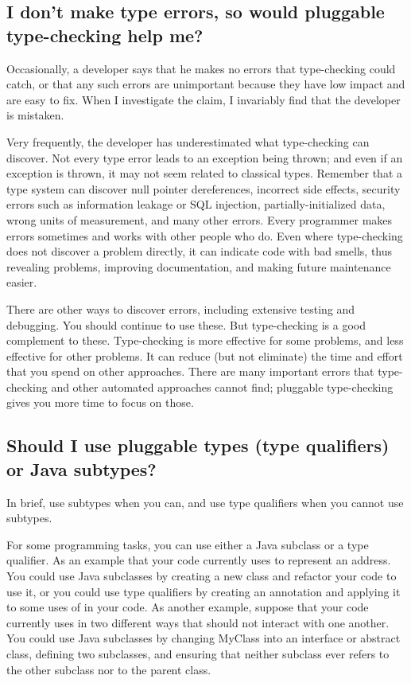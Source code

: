 \subsection{I don't make type errors, so would pluggable type-checking help me?\label{faq-never-make-type-errors}}

Occasionally, a developer says that he makes no errors that type-checking
could catch, or that any such errors are unimportant because they have low
impact and are easy to fix.  When I investigate the claim, I invariably
find that the developer is mistaken.

Very frequently, the developer has underestimated what type-checking can
discover.  Not every type error leads to an exception being thrown; and
even if an exception is thrown, it may not seem related to classical types.
Remember that a type system can discover
null pointer dereferences,
incorrect side effects,
security errors such as information leakage or SQL injection,
partially-initialized data,
wrong units of measurement,
and many other errors.
Every programmer makes errors sometimes and works with other people
who do.
Even where type-checking does not discover a
problem directly, it can indicate code with bad smells, thus revealing
problems, improving documentation, and making future maintenance easier.

There are other ways to discover errors, including extensive testing and
debugging.  You should continue to use these.
But type-checking is a good complement to these.  Type-checking is more
effective for some problems, and less effective for other problems.  It can
reduce (but not eliminate) the time and effort that you spend on other
approaches.  There are many important errors that type-checking and other
automated approaches cannot find; pluggable type-checking gives you more
time to focus on those.


\subsection{Should I use pluggable types (type qualifiers) or Java subtypes?\label{faq-typequals-vs-subtypes}}

\label{when-to-use-type-qualifiers}
\label{faq-qualifiers-vs-subclasses}

In brief, use subtypes when you can, and use type qualifiers when you cannot
use subtypes.

For some programming tasks, you can use either a Java subclass or a type
qualifier.  As an example that your code currently uses  to
represent an address.  You could use Java subclasses by creating a new
 class and refactor your code to use it, or you could use
type qualifiers by creating an  annotation and applying it
to some uses of  in your code.  As another example, suppose
that your code currently uses  in two different ways that
should not interact with one another.  You could use Java subclasses by
changing MyClass into an interface or abstract class, defining two
subclasses, and ensuring that neither subclass ever refers to the other
subclass nor to the parent class.

